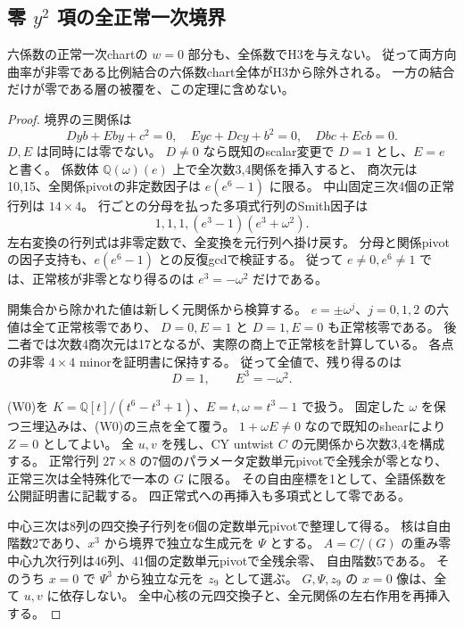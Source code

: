 \subsection{零 $y^2$ 項の全正常一次境界}
\label{subsec:cubic-third-root-unit-boundary-w0}
\begin{theorem}[零 $y^2$ 項の正常一次chartも空]
\label{thm:cubic-third-root-unit-boundary-w0-empty}
六係数の正常一次chartの $w=0$ 部分も、全係数でH3を与えない。
従って両方向曲率が非零である比例結合の六係数chart全体がH3から除外される。
一方の結合だけが零である層の被覆を、この定理に含めない。
\end{theorem}
\begin{proof}
境界の三関係は
\[
 Dyb+Eby+c^2=0,\quad Eyc+Dcy+b^2=0,\quad Dbc+Ecb=0.
\]
$D,E$ は同時には零でない。
$D\ne0$ なら既知のscalar変更で $D=1$ とし、$E=e$ と書く。
係数体 $\mathbb Q(\omega)(e)$ 上で全次数3,4関係を挿入すると、
商次元は10,15、全関係pivotの非定数因子は $e(e^6-1)$ に限る。
中山固定三次4個の正常行列は $14\times4$。
行ごとの分母を払った多項式行列のSmith因子は
\[
 1,1,1,(e^3-1)(e^3+\omega^2).
\]
左右変換の行列式は非零定数で、全変換を元行列へ掛け戻す。
分母と関係pivotの因子支持も、$e(e^6-1)$ との反復gcdで検証する。
従って $e\ne0,e^6\ne1$ では、正常核が非零となり得るのは
$e^3=-\omega^2$ だけである。

開集合から除かれた値は新しく元関係から検算する。
$e=\pm\omega^j$、$j=0,1,2$ の六値は全て正常核零であり、
$D=0,E=1$ と $D=1,E=0$ も正常核零である。
後二者では次数4商次元は17となるが、実際の商上で正常核を計算している。
各点の非零 $4\times4$ minorを証明書に保持する。
従って全値で、残り得るのは
\[
 D=1,\qquad E^3=-\omega^2.
\tag{W0}
\]

(W0)を $K=\mathbb Q[t]/(t^6-t^3+1)$、$E=t,\omega=t^3-1$ で扱う。
固定した $\omega$ を保つ三埋込みは、(W0)の三点を全て覆う。
$1+\omega E\ne0$ なので既知のshearにより $Z=0$ としてよい。
全 $u,v$ を残し、CY untwist $C$ の元関係から次数3,4を構成する。
正常行列 $27\times8$ の7個のパラメータ定数単元pivotで全残余が零となり、
正常三次は全特殊化で一本の $G$ に限る。
その自由座標を1として、全語係数を公開証明書に記載する。
四正常式への再挿入も多項式として零である。

中心三次は8列の四交換子行列を6個の定数単元pivotで整理して得る。
核は自由階数2であり、$x^3$ から境界で独立な生成元を $\Psi$ とする。
$A=C/(G)$ の重み零中心九次行列は46列、41個の定数単元pivotで全残余零、
自由階数5である。
そのうち $x=0$ で $\Psi^3$ から独立な元を $z_9$ として選ぶ。
$G,\Psi,z_9$ の $x=0$ 像は、全て $u,v$ に依存しない。
全中心核の元四交換子と、全元関係の左右作用を再挿入する。


\end{proof}
